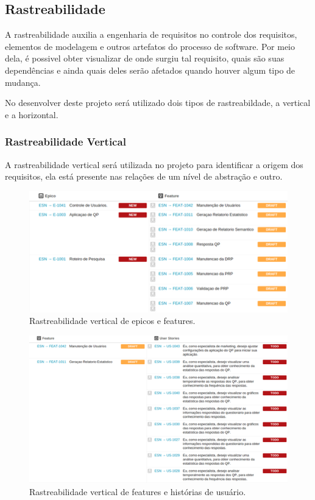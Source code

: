 	\subsection{Rastreabilidade}

	A rastreabilidade auxilia a engenharia de requisitos no controle dos requisitos, elementos de modelagem e outros artefatos do processo de software. Por meio dela, é possivel obter visualizar de onde surgiu tal requisito, quais são suas dependências e ainda quais deles serão afetados quando houver algum tipo de mudança.

	No desenvolver deste projeto será utilizado dois tipos de rastreabildade, a vertical e a horizontal.
	
	\subsubsection{Rastreabilidade Vertical}
	A rastreabilidade vertical será utilizada no projeto para identificar a origem dos requisitos, ela está presente nas relações de um nível de abstração e outro.\\

		\begin{figure}[!htp]
			\centering
			\includegraphics{imagens/epicfeat.png}
			\caption{Rastreabilidade vertical de epicos e features.}
			\label{imagem}
		\end{figure}

		\begin{figure}[!htp]
			\centering
			\includegraphics{imagens/featus.png}
			\caption{Rastreabilidade vertical de features e histórias de usuário.}
			\label{imagem}
		\end{figure}

